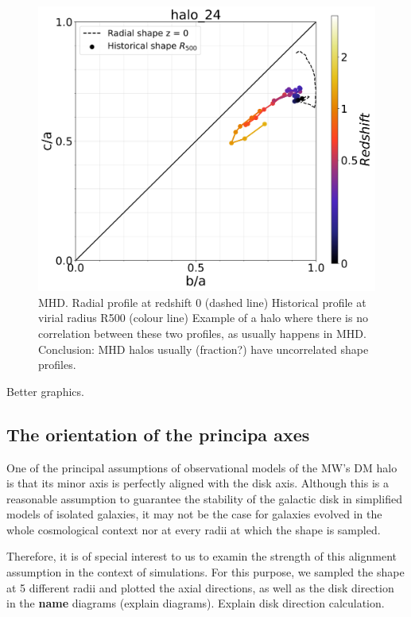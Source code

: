 \documentclass[a4paper,fleqn,usenatbib]{mnras}
\begin{document}
\begin{figure}
  \includegraphics[width=\columnwidth]{./pics/Redshift/halo_24_level3_MHD_Z_Triax.png}
  \caption{MHD. Radial profile at redshift 0 (dashed line)
    Historical profile at virial radius R500 (colour line)
    Example of a halo where there is no correlation
    between these two profiles, as usually happens in
    MHD. Conclusion: MHD halos usually (fraction?) have uncorrelated shape profiles.}
    \label{fig:MHD Z Triax} 
\end{figure}

Better graphics.



\subsection{The orientation of the principa axes}

One of the principal assumptions of observational models of the MW's
DM halo is that its minor axis is perfectly aligned with the disk
axis. Although this is a reasonable assumption to guarantee the
stability of the galactic disk in simplified models of isolated
galaxies, it may not be the case for galaxies evolved in the whole
cosmological context nor at every radii at which the shape is
sampled. 

Therefore, it is of special interest to us to examin the strength of
this alignment assumption in the context of simulations. For this
purpose, we sampled the shape at 5 different radii and plotted the
axial directions, as well as the disk direction in the \textbf{name}
diagrams \cite{} (explain diagrams). Explain disk direction
calculation. 
\end{document}
